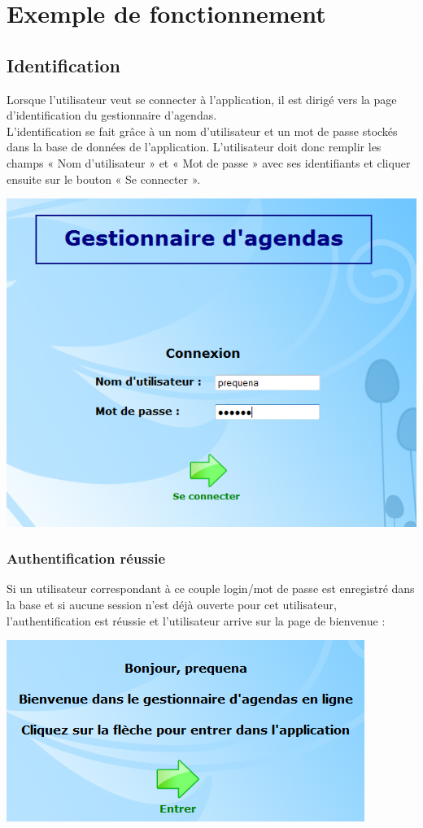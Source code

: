 \documentclass[12pt , a4paper]{article}
\begin{document}
\newpage
\section{Exemple de fonctionnement}
\subsection{Identification}
\noindent Lorsque l’utilisateur veut se connecter à l’application, il est dirigé vers la page d’identification
du gestionnaire d’agendas.\\
L’identification se fait grâce à un nom d’utilisateur et un mot de passe stockés dans la base de
données de l’application. L’utilisateur doit donc remplir les champs « Nom d’utilisateur » et
« Mot de passe » avec ses identifiants et cliquer ensuite sur le bouton « Se connecter ».

\begin{center}
  \includegraphics[scale=0.6]{./images/authentification2.png}
\end{center}

\subsubsection{Authentification réussie}
\noindent Si un utilisateur correspondant à ce couple login/mot de passe est enregistré dans la base et si
aucune session n’est déjà ouverte pour cet utilisateur, l’authentification est réussie et
l’utilisateur arrive sur la page de bienvenue :

\begin{center}
  \includegraphics[scale=0.6]{./images/authentification4.png}
\end{center}
\end{document}

